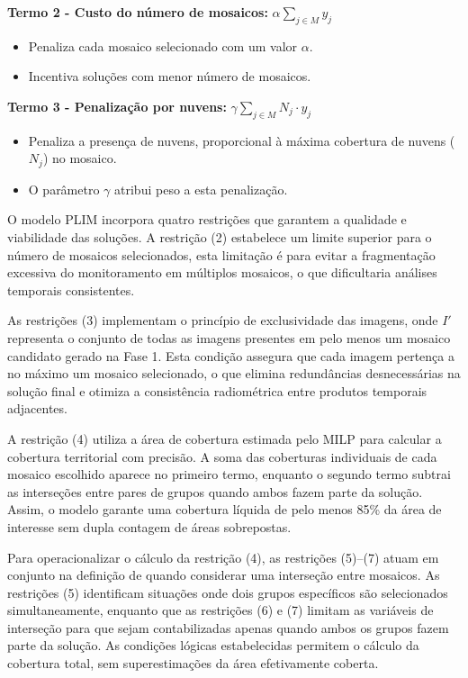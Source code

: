 \documentclass[a4paper,11pt]{article}
\begin{document}
\textbf{Termo 2 - Custo do número de mosaicos:} $\alpha \sum_{j \in M} y_j$
\begin{itemize}[noitemsep, topsep=0pt]
    \item Penaliza cada mosaico selecionado com um valor $\alpha$.
    \item Incentiva soluções com menor número de mosaicos.
\end{itemize}

\textbf{Termo 3 - Penalização por nuvens:} $\gamma \sum_{j \in M} N_j \cdot y_j$
\begin{itemize}[noitemsep, topsep=0pt]
    \item Penaliza a presença de nuvens, proporcional à máxima cobertura de nuvens ($N_j$) no mosaico.
    \item O parâmetro $\gamma$ atribui peso a esta penalização.
\end{itemize}

O modelo PLIM incorpora quatro restrições que garantem a qualidade e viabilidade das soluções. A restrição (2) estabelece um limite superior para o número de mosaicos selecionados, esta limitação é para evitar a fragmentação excessiva do monitoramento em múltiplos mosaicos, o que dificultaria análises temporais consistentes.

As restrições (3) implementam o princípio de exclusividade das imagens, onde $I'$ representa o conjunto de todas as imagens presentes em pelo menos um mosaico candidato gerado na Fase 1. Esta condição assegura que cada imagem pertença a no máximo um mosaico selecionado, o que elimina redundâncias desnecessárias na solução final e otimiza a consistência radiométrica entre produtos temporais adjacentes.

A restrição (4) utiliza a área de cobertura estimada pelo MILP para calcular a cobertura territorial com precisão. A soma das coberturas individuais de cada mosaico escolhido aparece no primeiro termo, enquanto o segundo termo subtrai as interseções entre pares de grupos quando ambos fazem parte da solução. Assim, o modelo garante uma cobertura líquida de pelo menos 85\% da área de interesse sem dupla contagem de áreas sobrepostas.

Para operacionalizar o cálculo da restrição (4), as restrições (5)--(7) atuam em conjunto na definição de quando considerar uma interseção entre mosaicos. As restrições (5) identificam situações onde dois grupos específicos são selecionados simultaneamente, enquanto que as restrições (6) e (7) limitam as variáveis de interseção para que sejam contabilizadas apenas quando ambos os grupos fazem parte da solução. As condições lógicas estabelecidas permitem o cálculo da cobertura total, sem superestimações da área efetivamente coberta.
\end{document}
